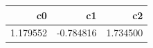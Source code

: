 \begin{tabular}{rrr}
\toprule
c0 & c1 & c2 \\
\midrule
1.179552 & -0.784816 & 1.734500 \\
\bottomrule
\end{tabular}
